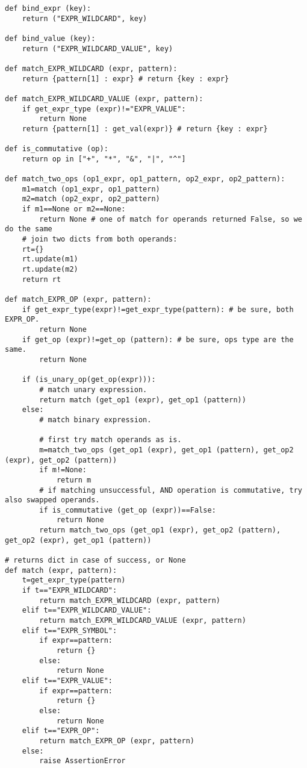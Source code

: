 \begin{lstlisting}
def bind_expr (key):
    return ("EXPR_WILDCARD", key)

def bind_value (key):
    return ("EXPR_WILDCARD_VALUE", key)

def match_EXPR_WILDCARD (expr, pattern):
    return {pattern[1] : expr} # return {key : expr}

def match_EXPR_WILDCARD_VALUE (expr, pattern):
    if get_expr_type (expr)!="EXPR_VALUE":
        return None
    return {pattern[1] : get_val(expr)} # return {key : expr}

def is_commutative (op):
    return op in ["+", "*", "&", "|", "^"]

def match_two_ops (op1_expr, op1_pattern, op2_expr, op2_pattern):
    m1=match (op1_expr, op1_pattern)
    m2=match (op2_expr, op2_pattern)
    if m1==None or m2==None:
        return None # one of match for operands returned False, so we do the same
    # join two dicts from both operands:
    rt={}
    rt.update(m1)
    rt.update(m2)
    return rt

def match_EXPR_OP (expr, pattern):
    if get_expr_type(expr)!=get_expr_type(pattern): # be sure, both EXPR_OP.
        return None
    if get_op (expr)!=get_op (pattern): # be sure, ops type are the same.
        return None

    if (is_unary_op(get_op(expr))):
        # match unary expression.
        return match (get_op1 (expr), get_op1 (pattern))
    else:     
        # match binary expression.     

        # first try match operands as is.
        m=match_two_ops (get_op1 (expr), get_op1 (pattern), get_op2 (expr), get_op2 (pattern))
        if m!=None:
            return m
        # if matching unsuccessful, AND operation is commutative, try also swapped operands.
        if is_commutative (get_op (expr))==False:
            return None
        return match_two_ops (get_op1 (expr), get_op2 (pattern), get_op2 (expr), get_op1 (pattern))

# returns dict in case of success, or None
def match (expr, pattern):
    t=get_expr_type(pattern)
    if t=="EXPR_WILDCARD":
        return match_EXPR_WILDCARD (expr, pattern)
    elif t=="EXPR_WILDCARD_VALUE":
        return match_EXPR_WILDCARD_VALUE (expr, pattern)
    elif t=="EXPR_SYMBOL":
        if expr==pattern:
            return {}
        else:
            return None
    elif t=="EXPR_VALUE":
        if expr==pattern:
            return {}
        else:
            return None
    elif t=="EXPR_OP":
        return match_EXPR_OP (expr, pattern)
    else:
        raise AssertionError
\end{lstlisting}

